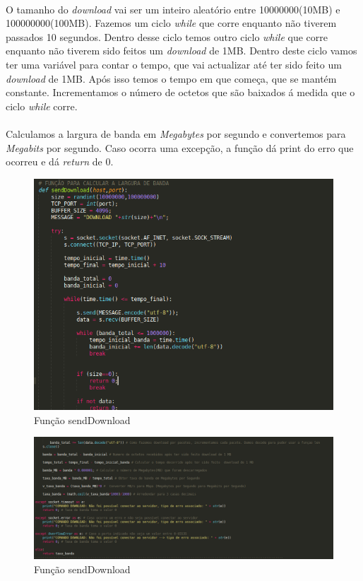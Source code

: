 \documentclass{report}
\begin{document}
\paragraph{}
O tamanho do \textit{download} vai ser um inteiro aleatório entre 10000000(10MB) e 100000000(100MB). Fazemos um ciclo \textit{while} que corre enquanto não tiverem passados 10 segundos. \newline
Dentro desse ciclo temos outro ciclo \textit{while} que corre enquanto não tiverem sido feitos um \textit{download} de 1MB. Dentro deste ciclo vamos ter uma variável para contar o tempo, que vai actualizar até ter sido feito um \textit{download} de 1MB. Após isso temos o tempo em que começa, que se mantém constante.
Incrementamos o número de octetos que são baixados á medida que o ciclo \textit{while} corre.
\paragraph{}
Calculamos a largura de banda em \textit{Megabytes} por segundo e convertemos para \textit{Megabits} por segundo.
Caso ocorra uma excepção, a função dá print do erro que ocorreu e dá \textit{return} de 0.


\begin{figure}[H]
\centering
\includegraphics[width=0.9\linewidth]{sendDownload1.png}
\caption{Função sendDownload}
\label{geDown1}
\end{figure}



\begin{figure}[H]
\centering
\includegraphics[width=1.2\linewidth]{sendDownload2.png}
\caption{Função sendDownload}
\label{geDown2}
\end{figure}
\end{document}

